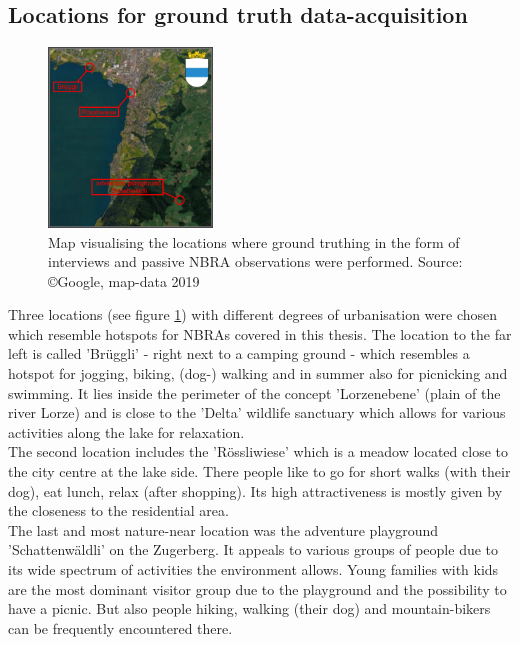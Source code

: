 \subsection{Locations for ground truth data-acquisition} \label{locations_ground_truthing_data}

\begin{figure} %
    \centerline{\includegraphics[trim={0 0 0 0},clip,width=0.39\textwidth]{img/interviews_locations}}
  \caption{Map visualising the locations where ground truthing in the form of interviews and passive NBRA observations were performed. Source: \copyright Google, map-data 2019}
  \label{fig:locations_ground_truthing}
\end{figure}

Three locations (see figure \ref{fig:locations_ground_truthing}) with different degrees of urbanisation were chosen which resemble hotspots for NBRAs covered in this thesis. The location to the far left is called 'Br\"uggli' - right next to a camping ground - which resembles a hotspot for jogging, biking, (dog-) walking and in summer also for picnicking and swimming. It lies inside the perimeter of the concept 'Lorzenebene' (plain of the river Lorze) and is close to the 'Delta' wildlife sanctuary which allows for various activities along the lake for relaxation.\\
The second location includes the 'R\"ossliwiese' which is a meadow located close to the city centre at the lake side. There people like to go for short walks (with their dog), eat lunch, relax (after shopping). Its high attractiveness is mostly given by the closeness to the residential area.\\
The last and most nature-near location was the adventure playground 'Schattenw\"aldli' on the Zugerberg. It appeals to various groups of people due to its wide spectrum of activities the environment allows. Young families with kids are the most dominant visitor group due to the playground and the possibility to have a picnic. But also people hiking, walking (their dog) and mountain-bikers can be frequently encountered there.

